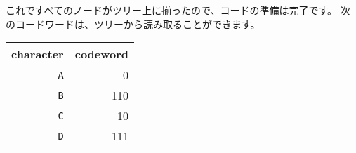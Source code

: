 これですべてのノードがツリー上に揃ったので、コードの準備は完了です。
次のコードワードは、ツリーから読み取ることができます。
\begin{center}
\begin{tabular}{rr}
character & codeword \\
\hline
\texttt{A} & 0 \\
\texttt{B} & 110 \\
\texttt{C} & 10 \\
\texttt{D} & 111 \\
\end{tabular}
\end{center}
